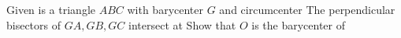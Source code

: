 Given is a triangle $ABC$ with barycenter $G$ and circumcenter The perpendicular bisectors of $GA,GB,GC$ intersect at Show that $O$ is the barycenter of 